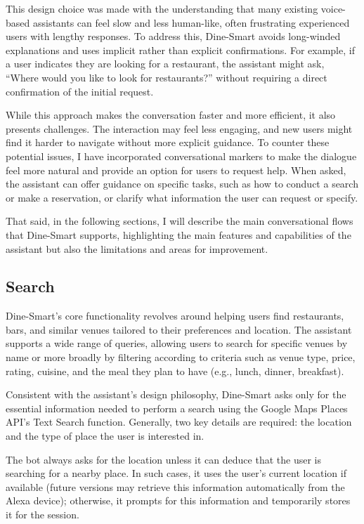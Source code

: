 \documentclass[twocolumn]{article}
\begin{document}
This design choice was made with the understanding that many existing voice-based assistants can feel slow and less human-like, often frustrating experienced users with lengthy responses. To address this, Dine-Smart avoids long-winded explanations and uses implicit rather than explicit confirmations. For example, if a user indicates they are looking for a restaurant, the assistant might ask, ``Where would you like to look for restaurants?'' without requiring a direct confirmation of the initial request.

While this approach makes the conversation faster and more efficient, it also presents challenges. The interaction may feel less engaging, and new users might find it harder to navigate without more explicit guidance. To counter these potential issues, I have incorporated conversational markers to make the dialogue feel more natural and provide an option for users to request help. When asked, the assistant can offer guidance on specific tasks, such as how to conduct a search or make a reservation, or clarify what information the user can request or specify.

That said, in the following sections, I will describe the main conversational flows that Dine-Smart supports, highlighting the main features and capabilities of the assistant but also the limitations and areas for improvement.

\subsection{Search}

Dine-Smart’s core functionality revolves around helping users find restaurants, bars, and similar venues tailored to their preferences and location. The assistant supports a wide range of queries, allowing users to search for specific venues by name or more broadly by filtering according to criteria such as venue type, price, rating, cuisine, and the meal they plan to have (e.g., lunch, dinner, breakfast).

Consistent with the assistant’s design philosophy, Dine-Smart asks only for the essential information needed to perform a search using the Google Maps Places API's Text Search function. Generally, two key details are required: the location and the type of place the user is interested in.

The bot always asks for the location unless it can deduce that the user is searching for a nearby place. In such cases, it uses the user’s current location if available (future versions may retrieve this information automatically from the Alexa device); otherwise, it prompts for this information and temporarily stores it for the session.
\end{document}
